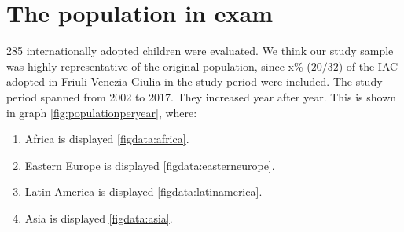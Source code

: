 \section{The population in exam}\label{sec:thepopulationinexam}
285 internationally adopted children were evaluated. We think our study sample was highly representative of the original population, since x\% ($20/32$) of the IAC adopted in Friuli-Venezia Giulia in the study period were included.
The study period spanned from 2002 to 2017. They increased year after year. This is shown in graph \ref{fig:populationperyear}, where:

\begin{enumerate}
	\item Africa is displayed \ref{figdata:africa}.
	\item Eastern Europe is displayed \ref{figdata:easterneurope}.
	\item Latin America is displayed \ref{figdata:latinamerica}.
	\item Asia is displayed \ref{figdata:asia}.
\end{enumerate}


